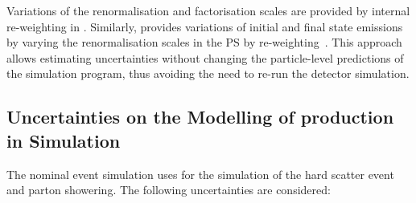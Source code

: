 Variations of the renormalisation and factorisation scales are provided by
internal re-weighting in \POWHEGBOX[v2]. Similarly, \PYTHIA[8] provides
variations of initial and final state emissions by varying the renormalisation
scales in the PS by re-weighting~\cite{Mrenna:2016sih,pythia-variations-online}.
This approach allows estimating uncertainties without changing the
particle-level predictions of the simulation program, thus avoiding the need to
re-run the detector simulation.


\subsection{Uncertainties on the Modelling of \Zjets production in Simulation}%
\label{app:zjets_uncertainties}

The nominal \Zjets event simulation uses \SHERPA[2.2.1] for the simulation of
the hard scatter event and parton showering. The following uncertainties are
considered:
